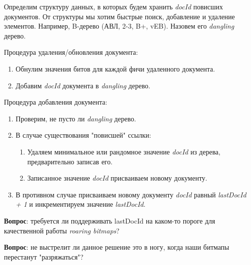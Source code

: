 Определим структуру данных, в которых будем хранить \textit{docId} повисших
документов. От структуры мы хотим быстрые поиск, добавление и удаление элементов.
Например, B-дерево (АВЛ, 2-3, B+, vEB). Назовем его \textit{dangling} дерево.

Процедура удаления/обновления документа:
\begin{enumerate}
    \item Обнулим значения битов для каждой фичи удаленного документа.
    \item Добавим \textit{docId} документа в \textit{dangling} дерево.
\end{enumerate}

Процедура добавления документа:
\begin{enumerate}
    \item Проверим, не пусто ли \textit{dangling} дерево.
    \item В случае существования "повисшей" ссылки:
    \begin{enumerate}
        \item Удаляем минимальное или рандомное значение \textit{docId} из
         дерева, предварительно записав его.
        \item Записанное значение \textit{docId} присваиваем новому документу.
    \end{enumerate}
    \item В противном случае присваиваем новому документу \textit{docId} равный
    \textit{lastDocId + 1} и инкрементируем значение \textit{lastDocId}.
\end{enumerate}

\textbf{Вопрос}: требуется ли поддерживать lastDocId на каком-то пороге для
качественной работы \textit{roaring bitmaps}?

\textbf{Вопрос}: не выстрелит ли данное решение это в ногу, когда наши битмапы
перестанут "разряжаться"?
